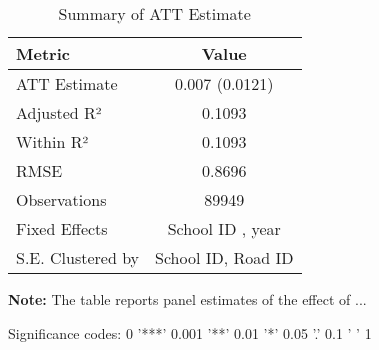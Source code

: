 \begin{table}[H]
\centering
\caption{Summary of ATT Estimate}
\label{tab:SA_reading_50p}
 \begin{center}
 \begin{tabular}{lc}
 \toprule
Metric & Value \\
\midrule
ATT Estimate & 0.007 (0.0121) \\
\hline 
 Adjusted R² & 0.1093 \\
Within R² & 0.1093 \\
RMSE & 0.8696 \\
Observations & 89949 \\
\hline 
 Fixed Effects & School ID ,  year \\
S.E. Clustered by & School ID, Road ID \\
\bottomrule
\end{tabular}
 \end{center}\begin{tablenotes}
\small
\item \textbf{Note:} The table reports panel estimates of the effect of ...
\item Significance codes: 0 '***' 0.001 '**' 0.01 '*' 0.05 '.' 0.1 ' ' 1
\end{tablenotes}
\end{table}